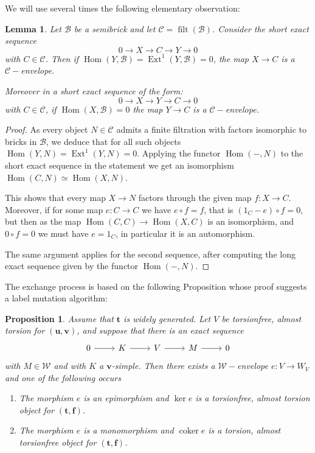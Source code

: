 \documentclass[11pt]{amsart}
\newtheorem{proposition}[theorem]{Proposition}
\newtheorem{lemma}[theorem]{Lemma}
\theoremstyle{definition}
\newcommand{\coker}{\operatorname{coker}}
\newcommand{\B}{\mathcal B}
\newcommand{\filt}{\operatorname{filt}}
\newcommand{\Hom}{\operatorname{Hom}}
\newcommand{\Ext}{\operatorname{Ext}}
\newcommand{\tpair}[2]{(\mathbf{#1}, \mathbf{#2})  }
\begin{document}
We will use several times the following elementary observation:

\begin{lemma}
\label{lem:approxim-lem}
Let $ \B $ be a semibrick and let $ \mathcal{C} = \filt(\B) $. Consider the short exact sequence
\[
0 \to X \to C \to Y \to 0
\]
with $ C \in \mathcal{C} $. Then if $ \Hom(Y, \B) = \Ext^1(Y, \B) = 0 $, the map $ X \to C $ is a $ \mathcal{C}-$envelope.

Moreover in a short exact sequence of the form:
\[
0 \to X \to Y \to C \to 0
\]
with $ C \in \mathcal{C} $, if $ \Hom(X, \B) = 0 $ the map $ Y \to C $ is a $ \mathcal{C}-$envelope.
\end{lemma}

\begin{proof}
As every object $ N \in \mathcal{C} $ admits a finite filtration with factors isomorphic to bricks in $ \B $, we deduce that for all such objects  $ \Hom(Y, N) = \Ext^1(Y, N) = 0 $. Applying the functor $ \Hom(-, N) $ to the short exact sequence in the statement we get an isomorphism $ \Hom(C, N) \simeq \Hom(X, N) $.  

This shows that every map $ X \to N $ factors through the given map $ f :  X \to C $. Moreover, if for some map $ e : C \to C $ we have $ e \circ f = f $, that is $ (1_C - e) \circ f = 0 $, but then as the map $ \Hom(C, C) \to \Hom(X, C) $ is an isomorphism, and $ 0 \circ f = 0 $ we must have $ e = 1_C $, in particular it is an automorphism.

The same argument applies for the second sequence, after computing the long exact sequence given by the functor $ \Hom(-, N) $.
\end{proof}

The exchange process is based on the following Proposition whose proof suggests a label mutation algorithm:

\begin{proposition}
\label{prop:exchange-algo}
Assume that \(\mathbf t\) is widely generated. Let \(V\)  be torsionfree, almost torsion for \(\tpair{u}{v}\), and suppose that there is an exact sequence
\[
\begin{tikzcd}
0\ar[r] & K \ar[r] & V\ar[r] & M \ar[r] & 0
\end{tikzcd}
\]
with \(M\in\mathcal{W}\) and with \(K\) a \(\mathbf v\)-simple. Then there exists a \( \mathcal{W}-\)envelope \( e : V \to W_V \) and one of the following occurs
\begin{enumerate}
\item The morphism \(e \) is an epimorphism and \(\ker e \) is a torsionfree, almost torsion object for \( \tpair{t}{f} \).
\item The morphism \(e \) is a monomorphism and \( \coker e \) is a torsion, almost torsionfree object for \( \tpair{t}{f} \).
\end{enumerate}
\end{proposition}
\end{document}
